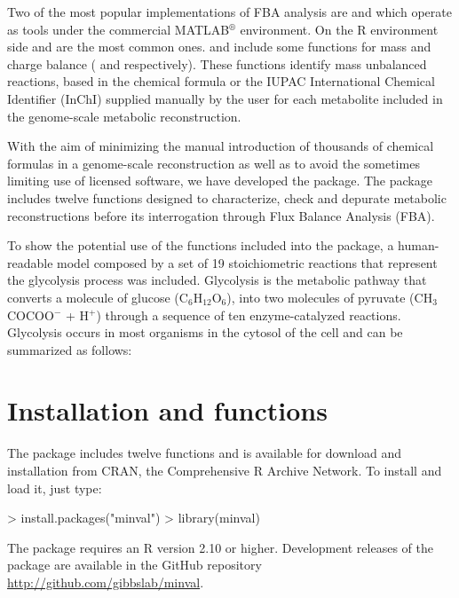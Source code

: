 Two of the most popular implementations of FBA analysis are  \citep{Becker2007} and  \citep{Agren2013} which operate as tools under the commercial MATLAB$^{\circledR}$ environment.  On the R environment side   \citep{sybil} and  are the most common ones.  and  include  some functions for mass and charge balance ( and  respectively). These functions identify mass unbalanced reactions, based in the chemical formula or the IUPAC International Chemical Identifier (InChI) supplied manually by the user for each metabolite included in the genome-scale metabolic reconstruction.

With the aim of minimizing the manual introduction of thousands of chemical formulas in a genome-scale reconstruction as well as to avoid the sometimes limiting use of licensed software, we have developed the  package. The  package includes twelve functions designed to characterize, check and depurate metabolic reconstructions before its interrogation through Flux Balance Analysis (FBA).

To show the potential use of the functions included into the  package, a human-readable model composed by a set of 19 stoichiometric reactions that represent the glycolysis process was included. Glycolysis is the metabolic pathway that converts a molecule of glucose (C$_{6}$H$_{12}$O$_{6}$), into two molecules of pyruvate (CH$_{3}$COCOO$^{-}$ + H$^{+}$) through a  sequence of ten enzyme-catalyzed reactions. Glycolysis occurs in most organisms in the cytosol of the cell and can be summarized as follows: 

\section{Installation and functions}
The  package includes twelve functions and is available for download and installation from CRAN, the
Comprehensive R Archive Network. To install and load it, just type:
\begin{Schunk}
\begin{Sinput}
> install.packages("minval")
> library(minval)
\end{Sinput}
\end{Schunk}
\noindent The  package requires an R version 2.10 or higher. Development releases of the package are available in the GitHub repository \url{http://github.com/gibbslab/minval}.

